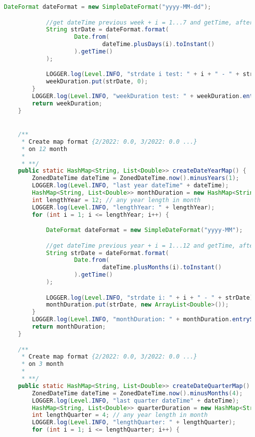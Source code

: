 \begin{lstlisting}[language=Java]
            DateFormat dateFormat = new SimpleDateFormat("yyyy-MM-dd");

            //get dateTime previous week + i = 1...7 and getTime, after in strDate=2022-03-01
            String strDate = dateFormat.format(
                    Date.from(
                            dateTime.plusDays(i).toInstant()
                    ).getTime()
            );

            LOGGER.log(Level.INFO, "strdate i test: " + i + " - " + strDate);
            weekDuration.put(strDate, 0);
        }
        LOGGER.log(Level.INFO, "weekDuration test: " + weekDuration.entrySet());
        return weekDuration;
    }


    /**
     * Create map format {2/2022: 0.0, 3/2022: 0.0 ...}
     * on 12 month
     *
     * **/
    public static HashMap<String, List<Double>> createDateYearMap() {
        ZonedDateTime dateTime = ZonedDateTime.now().minusYears(1);
        LOGGER.log(Level.INFO, "last year dateTime" + dateTime);
        HashMap<String, List<Double>> monthDuration = new HashMap<String, List<Double>>();
        int lengthYear = 12; // any year length in month
        LOGGER.log(Level.INFO, "lengthYear: " + lengthYear);
        for (int i = 1; i <= lengthYear; i++) {

            DateFormat dateFormat = new SimpleDateFormat("yyyy-MM");

            //get dateTime previous year + i = 1...12 and getTime, after in strDate=2022-03
            String strDate = dateFormat.format(
                    Date.from(
                            dateTime.plusMonths(i).toInstant()
                    ).getTime()
            );

            LOGGER.log(Level.INFO, "strdate i: " + i + " - " + strDate);
            monthDuration.put(strDate, new ArrayList<Double>());
        }
        LOGGER.log(Level.INFO, "monthDuration: " + monthDuration.entrySet());
        return monthDuration;
    }

    /**
     * Create map format {2/2022: 0.0, 3/2022: 0.0 ...}
     * on 3 month
     *
     * **/
    public static HashMap<String, List<Double>> createDateQuarterMap() {
        ZonedDateTime dateTime = ZonedDateTime.now().minusMonths(4);
        LOGGER.log(Level.INFO, "last quarter dateTime" + dateTime);
        HashMap<String, List<Double>> quarterDuration = new HashMap<String, List<Double>>();
        int lengthQuarter = 4; // any year length in month
        LOGGER.log(Level.INFO, "lengthQuarter: " + lengthQuarter);
        for (int i = 1; i <= lengthQuarter; i++) {


\end{lstlisting}
